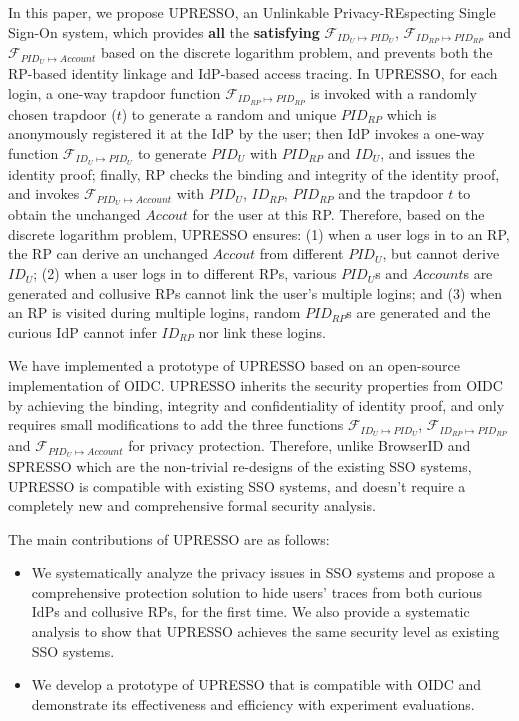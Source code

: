 In this paper, we propose UPRESSO, an Unlinkable Privacy-REspecting Single Sign-On system,
which provides \textbf{all} the \textbf{satisfying} $\mathcal{F}_{ID_{U} \mapsto PID_{U}}$, $\mathcal{F}_{ID_{RP} \mapsto PID_{RP}}$ and $\mathcal{F}_{PID_{U} \mapsto Account}$ based on the discrete logarithm problem, and prevents both the RP-based identity linkage and IdP-based access tracing.
In UPRESSO, for each login,   a one-way trapdoor function $\mathcal{F}_{ID_{RP} \mapsto PID_{RP}}$ is invoked with a randomly chosen trapdoor ($t$) to generate a random and unique $PID_{RP}$ which is anonymously registered it at the IdP by the user;
then IdP invokes a one-way function  $\mathcal{F}_{ID_{U} \mapsto PID_{U}}$ to generate $PID_U$ with $PID_{RP}$ and $ID_U$, and issues the identity proof;
finally, RP checks the binding and integrity of the identity proof, and invokes $\mathcal{F}_{PID_{U} \mapsto Account}$ with $PID_U$, $ID_{RP}$, $PID_{RP}$ and the trapdoor $t$ to obtain the unchanged $Accout$ for the user at this RP.
Therefore, based on the discrete logarithm problem,
 UPRESSO ensures:
 (1) when a  user logs in to an RP, the RP can derive an unchanged $Accout$ from different $PID_U$, but cannot  derive $ID_U$;
 (2) when a user logs in to different RPs, various $PID_U$s and $Account$s are generated and collusive RPs cannot link the user's multiple logins;
 and (3) when an RP is visited during multiple logins, random $PID_{RP}$s are generated and the curious IdP cannot infer $ID_{RP}$ nor link these logins.



We have implemented a prototype of UPRESSO based on an open-source implementation of OIDC.
UPRESSO inherits the security properties from OIDC by achieving the binding, integrity and confidentiality of identity proof,
  and only requires small modifications to add the three functions $\mathcal{F}_{ID_{U} \mapsto PID_{U}}$, $\mathcal{F}_{ID_{RP} \mapsto PID_{RP}}$ and $\mathcal{F}_{PID_{U} \mapsto Account}$ for privacy protection.
Therefore,
 unlike  BrowserID and SPRESSO which are the non-trivial re-designs of the existing SSO systems,
UPRESSO is compatible with existing SSO systems,
 and doesn't require a completely new and comprehensive formal security analysis.


The main contributions of UPRESSO are as follows:
\begin{itemize}
\item We systematically analyze the privacy issues in SSO systems and propose a comprehensive protection solution to hide users' traces from both curious IdPs and collusive RPs, for the first time. We also provide a systematic analysis to show that UPRESSO achieves the same security level as existing SSO systems.
\item We develop a prototype of UPRESSO that is compatible with OIDC and demonstrate its effectiveness and efficiency with experiment evaluations.
\end{itemize}





